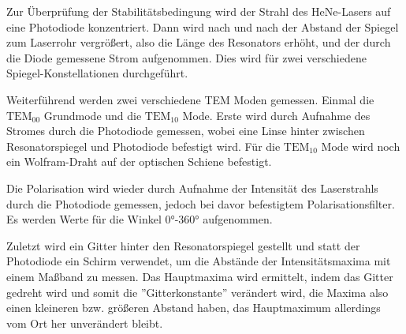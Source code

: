 \noindent Zur Überprüfung der Stabilitätsbedingung wird der Strahl des HeNe-Lasers auf eine Photodiode konzentriert. Dann wird nach und nach der Abstand der Spiegel zum Laserrohr vergrößert, also die Länge des Resonators erhöht, und der durch die Diode gemessene Strom aufgenommen. Dies wird für zwei verschiedene Spiegel-Konstellationen durchgeführt.

\noindent Weiterführend werden zwei verschiedene TEM Moden gemessen. Einmal die \(\text{TEM}_{00}\) Grundmode und die \(\text{TEM}_{10}\) Mode. Erste wird durch Aufnahme des Stromes durch die Photodiode gemessen, wobei eine Linse hinter zwischen Resonatorspiegel und Photodiode befestigt wird. Für die \(\text{TEM}_{10}\) Mode wird noch ein Wolfram-Draht auf der optischen Schiene befestigt.

\noindent Die Polarisation wird wieder durch Aufnahme der Intensität des Laserstrahls durch die Photodiode gemessen, jedoch bei davor befestigtem Polarisationsfilter. Es werden Werte für die Winkel 0°-360° aufgenommen.

\noindent Zuletzt wird ein Gitter hinter den Resonatorspiegel gestellt und statt der Photodiode ein Schirm verwendet, um die Abstände der Intensitätsmaxima mit einem Maßband zu messen. Das Hauptmaxima wird ermittelt, indem das Gitter gedreht wird und somit die ''Gitterkonstante'' verändert wird, die Maxima also einen kleineren bzw. größeren Abstand haben, das Hauptmaximum allerdings vom Ort her unverändert bleibt.